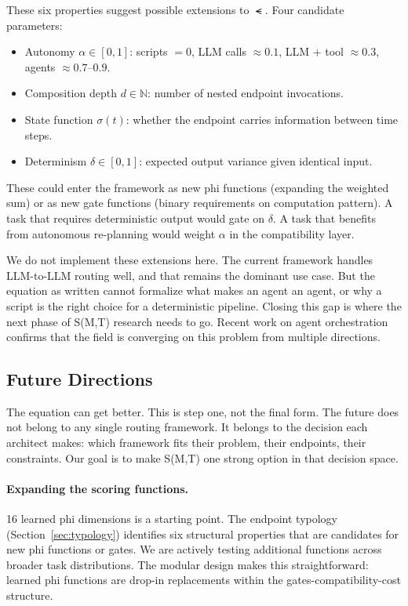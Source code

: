 \medskip

These six properties suggest possible extensions to $\smt$. Four candidate parameters:

\begin{itemize}
    \item Autonomy $\alpha \in [0,1]$: scripts $= 0$, LLM calls $\approx 0.1$, LLM + tool $\approx 0.3$, agents $\approx 0.7$--$0.9$.
    \item Composition depth $d \in \mathbb{N}$: number of nested endpoint invocations.
    \item State function $\sigma(t)$: whether the endpoint carries information between time steps.
    \item Determinism $\delta \in [0,1]$: expected output variance given identical input.
\end{itemize}

These could enter the framework as new phi functions (expanding the weighted sum) or as new gate functions (binary requirements on computation pattern). A task that requires deterministic output would gate on $\delta$. A task that benefits from autonomous re-planning would weight $\alpha$ in the compatibility layer.

We do not implement these extensions here. The current framework handles LLM-to-LLM routing well, and that remains the dominant use case. But the equation as written cannot formalize what makes an agent an agent, or why a script is the right choice for a deterministic pipeline. Closing this gap is where the next phase of S(M,T) research needs to go. Recent work on agent orchestration~\citep{moma2025routing, daao2025} confirms that the field is converging on this problem from multiple directions.

\subsection{Future Directions}

The equation can get better. This is step one, not the final form. The future does not belong to any single routing framework. It belongs to the decision each architect makes: which framework fits their problem, their endpoints, their constraints. Our goal is to make S(M,T) one strong option in that decision space.

\paragraph{Expanding the scoring functions.} 16 learned phi dimensions is a starting point. The endpoint typology (Section~\ref{sec:typology}) identifies six structural properties that are candidates for new phi functions or gates. We are actively testing additional functions across broader task distributions. The modular design makes this straightforward: learned phi functions are drop-in replacements within the gates-compatibility-cost structure.

